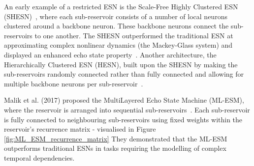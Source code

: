 
An early example of a restricted ESN is the Scale-Free Highly Clustered ESN (SHESN)~\cite{deng_and_zhang_2007}, where each sub-reservoir consists of a number of local neurons clustered around a backbone neuron. These backbone neurons connect the sub-reservoirs to one another. The SHESN outperformed the traditional ESN at approximating complex nonlinear dynamics (the Mackey-Glass system) and displayed an enhanced echo state property~\cite{deng_and_zhang_2007}. Another architecture, the Hierarchically Clustered ESN (HESN), built upon the SHESN by making the sub-reservoirs randomly connected rather than fully connected and allowing for multiple backbone neurons per sub-reservoir~\cite{jarvis_2010}.

Malik et al. (2017) proposed the  MultiLayered Echo State Machine (ML-ESM), where the reservoir is arranged into sequential sub-reservoirs~\cite{malik_2017}. Each sub-reservoir is fully connected to neighbouring sub-reservoirs using fixed weights within the reservoir's recurrence matrix - visualised in Figure \ref{fig:ML_ESM_recurrence_matrix} They demonstrated that the ML-ESM outperforms traditional ESNs in tasks requiring the modelling of complex temporal dependencies.

        

